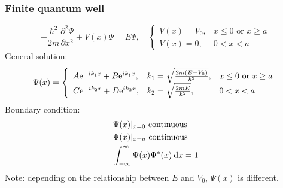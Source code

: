 \documentclass{beamer}
\begin{document}
    \begin{frame} \frametitle{Finite quantum well}
        \begin{equation*}
            - \frac{\hbar^2}{2m} \frac{\partial^2 \Psi}{\partial x^2} + V(x) \Psi = E \Psi  , \quad \left\{
                \begin{array}{ll}
                    V(x) = V_0, & x \le 0 \text{ or } x \ge a \\
                    V(x) = 0, & 0 < x < a
                \end{array}
            \right.
        \end{equation*}
        General solution:
        \begin{equation*}
            \Psi(x) = 
            \left\{
                \begin{array}{lll}
                    A \mathrm{e}^{-i k_1 x} + B \mathrm{e}^{ik_1 x}, & k_1 = \sqrt{\frac{2m(E - V_0)}{\hbar^2} } , & x \le 0\text{ or }x \ge a \\
                    C \mathrm{e}^{-ik_2x} + D \mathrm{e}^{ik_2 x}, & k_2 = \sqrt{\frac{2mE}{\hbar^2} } , & 0 < x < a 
                \end{array}
            \right.
        \end{equation*}
        Boundary condition:
        \begin{equation*}
            \begin{aligned}
                    & \Psi (x) | _{x = 0} \text{ continuous}\\
                    & \Psi (x) | _{x = a} \text{ continuous}\\
                    & \int_{-\infty}^{\infty} \Psi(x) \Psi^*(x) \: \mathrm{d} x = 1 \\
            \end{aligned}
        \end{equation*}
        Note: depending on the relationship between $E$ and $V_0$, $\Psi(x)$ is different.
    \end{frame}
\end{document}
